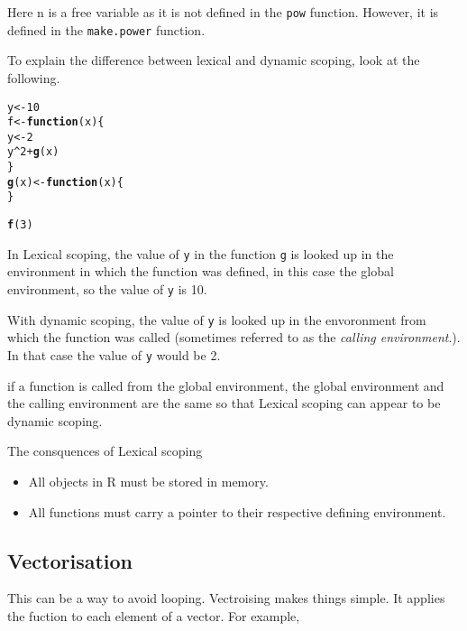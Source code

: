 \documentclass[12pt, a4paper, oneside]{article}\usepackage[]{graphicx}\usepackage[]{color}
\makeatletter
\newcommand{\hlnum}[1]{\textcolor[rgb]{0.686,0.059,0.569}{#1}}%
\newcommand{\hlopt}[1]{\textcolor[rgb]{0,0,0}{#1}}%
\newcommand{\hlstd}[1]{\textcolor[rgb]{0.345,0.345,0.345}{#1}}%
\newcommand{\hlkwa}[1]{\textcolor[rgb]{0.161,0.373,0.58}{\textbf{#1}}}%
\newcommand{\hlkwb}[1]{\textcolor[rgb]{0.69,0.353,0.396}{#1}}%
\newcommand{\hlkwc}[1]{\textcolor[rgb]{0.333,0.667,0.333}{#1}}%
\newcommand{\hlkwd}[1]{\textcolor[rgb]{0.737,0.353,0.396}{\textbf{#1}}}%
\newenvironment{kframe}{%
 \def\at@end@of@kframe{}%
 \ifinner\ifhmode%
  \def\at@end@of@kframe{\end{minipage}}%
  \begin{minipage}{\columnwidth}%
 \fi\fi%
 \def\FrameCommand##1{\hskip\@totalleftmargin \hskip-\fboxsep
 \colorbox{shadecolor}{##1}\hskip-\fboxsep
     \hskip-\linewidth \hskip-\@totalleftmargin \hskip\columnwidth}%
 \MakeFramed {\advance\hsize-\width
   \@totalleftmargin\z@ \linewidth\hsize
   \@setminipage}}%
 {\par\unskip\endMakeFramed%
 \at@end@of@kframe}
\newenvironment{knitrout}{}{} %
\makeatother
\begin{document}
Here n is a free variable as it is not defined in the \lstinline{pow} function.  However, it is defined in the \lstinline{make.power} function. 

To explain the difference between lexical and dynamic scoping, look at the following.
\begin{knitrout}
\color{fgcolor}\begin{kframe}
\begin{alltt}
\hlstd{y} \hlkwb{<-} \hlnum{10}
\hlstd{f} \hlkwb{<-} \hlkwa{function}\hlstd{(}\hlkwc{x}\hlstd{) \{}
    \hlstd{y} \hlkwb{<-} \hlnum{2}
    \hlstd{y}\hlopt{^}\hlnum{2} \hlopt{+} \hlkwd{g}\hlstd{(x)}
\hlstd{\}}
\hlkwd{g}\hlstd{(x)} \hlkwb{<-} \hlkwa{function}\hlstd{(}\hlkwc{x}\hlstd{) \{}
\hlstd{\}}
\end{alltt}


{\ttfamily\noindent\bfseries{}}\begin{alltt}
\hlkwd{f}\hlstd{(}\hlnum{3}\hlstd{)}
\end{alltt}


{\ttfamily\noindent\bfseries{}}\end{kframe}
\end{knitrout}

In Lexical scoping, the value of \lstinline{y} in the function \lstinline{g} is looked up in the environment in which the function was defined, in this case the global environment, so the value of \lstinline{y} is 10. 

With dynamic scoping, the value of \lstinline{y} is looked up in the envoronment from which the function was called (sometimes referred to as the \emph{calling environment}.).  In that case the value of \lstinline{y} would be 2. 

if a function is called from the global environment, the global environment and the calling environment are the same so that Lexical scoping can appear to be dynamic scoping. 

The consquences of Lexical scoping
\begin{itemize}
\item All objects in R must be stored in memory.
\item All functions must carry a pointer to their respective defining environment.
\end{itemize}

\subsection{Vectorisation}
This can be a way to avoid looping.  Vectroising makes things simple.  It applies the fuction to each element of a vector.  For example, 
\end{document}
